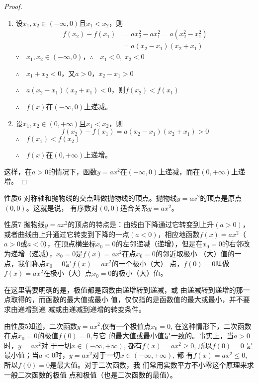 \begin{proof}
\begin{enumerate}
    \item 设$x_1,x_2\in(-\infty,0)$且$x_1<x_2$，则
    \[\begin{split}
        f(x_2)-f(x_1)&=ax^2_2-ax^2_1=a(x^2_2-x^2_1)\\
&=a(x_2-x_1)(x_2+x_1)
    \end{split}\]
$\because \quad x_1,x_2\in(-\infty,0)$，$\therefore\quad x_1<0,\; x_2<0$

$\therefore\quad x_1+x_2<0$，又$a>0$，$x_2-x_1>0$

$\therefore\quad a(x_2-x_1)(x_2+x_1)<0$，则$f(x_2)<f(x_1)$

$\therefore\quad f(x)$在$(-\infty,0)$上递减。

    \item 设$x_1,x_2\in(0,+\infty)$且$x_1<x_2$，则
    \[f(x_2)-f(x_1)=a(x_2-x_1)(x_2+x_1)>0\]
    $\therefore\quad f(x_1)<f(x_2)$

$\therefore\quad f(x)$在$(0,+\infty)$上递增。
\end{enumerate} 

这样，在$a>0$的情况下，函数$y=ax^2$在$(-\infty,0)$上递减，而在$(0,+\infty)$上递增。
\end{proof}

\begin{blk}{性质6}
对称轴和抛物线的交点叫做抛物线的顶点。抛物线$y=ax^2$的顶点是原点$(0,0)$。这就是说，
有序数对$(0,0)$适合关系$y=ax^2$。
\end{blk}

\begin{blk}{性质7}
    抛物线$y=ax^2$的顶点的特点是：曲线由下降通过它转变到上升$(a>0)$，或者曲线由上升通过它转变到下降的一点$(a<0)$，相应地函数$f(x)=ax^2$（$a>0$或$a<0$），在顶点横坐标$x_0=0$的左邻递减（递增），但是在$x_0=0$的右邻改为递增（递减），$x_0=0$是$f(x)=ax^2$在点$x_0=0$的邻近取极小
    （大）值的一点，我们称点$x_0=0$是$f(x)=ax^2$的一个极小（大）
    点，$f(0)=0$叫做$f(x)=ax^2$在极小（大）点$x_0=0$的极小（大）值。
\end{blk}



    在这里需要明确的是，极值都是函数由递增转到递减，或
    由递减转到递增的那一点取得的，而函数的最大值或最小
    值，仅仅指的是函数值的最大或最小，并不要求由递增到递
    减或由递减到递增的转变条件。

    由性质5知道，二次函数$y=ax^2$,仅有一个极值点$x_0=0$,
    在这种情形下，二次函数在点$x_0=0$的极值$f(0)=0$,与它
    的最大值或最小值是一致的。事实上，当$a>0$时，$y=ax^2$对
    于一切$x\in(-\infty,+\infty)$, 都有$f(x)=ax^2\ge 0$, 所以$f(0)=0$
    是最小值；当$a<0$时，$y=ax^2$对于一切$x\in(-\infty,+\infty)$, 都
    有$f(x)=ax^2\le 0$, 所以$f(0)=0$是最大值。对于二次函数，我
    们常用实数平方不小零这个原理来求一般二次函数的极值
    点和极值（也是二次函数的最值）。

